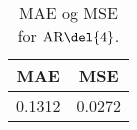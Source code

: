 \begin{table}
\center
\begin{tabular}{cc}
\toprule
 MAE & MSE \\ \midrule
 0.1312 & 0.0272 \\ \bottomrule
\end{tabular}
\caption{MAE og MSE for \(\text{AR} \del{4}\).} \label{tab:tabs_ar}
\end{table}
